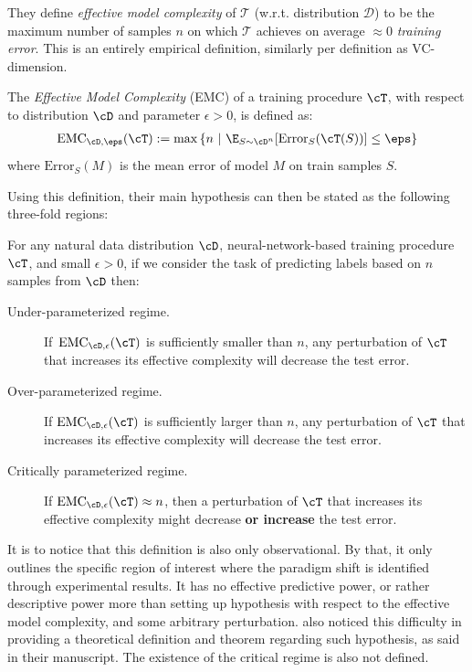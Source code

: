 \documentclass[10pt]{article} %
\begin{document}
They define \emph{effective model complexity} of $\mathcal{T}$ (w.r.t. distribution $\mathcal D$) to be the maximum number of samples $n$ on which $\mathcal{T}$ achieves on average $\approx 0$ \emph{training error}. This is an entirely empirical definition, similarly per definition as VC-dimension. 

\newcommand{\EMC}{\mathrm{EMC}}
\begin{definition}
The \emph{Effective Model Complexity} (EMC) of a training procedure $\cT$, with respect to distribution $\cD$ and parameter $\epsilon>0$,
is defined as:
\begin{align*}
    \EMC_{\cD,\eps}(\cT)
    :=  \max \left\{n ~|~ \E_{S \sim \cD^n}[ \mathrm{Error}_S( \cT( S )  ) ] \leq \eps \right\}
    \end{align*}
    where $\mathrm{Error}_S(M)$ is the mean error of model $M$ on train samples $S$.
\end{definition}

Using this definition, their main hypothesis can then be stated as the following three-fold regions:

\begin{hypothesis} \label{hyp:informaldd}
For any natural data distribution $\cD$, neural-network-based training procedure $\cT$, and small $\epsilon>0$,
if we consider the task of predicting labels based on  $n$ samples from $\cD$ then:
\begin{description}
    \item[Under-parameterized regime.]  If~$\EMC_{\cD,\epsilon}(\cT)$ is sufficiently smaller than $n$, any perturbation of $\cT$ that increases its effective complexity will decrease the test error.
    \item[Over-parameterized regime.] If $\EMC_{\cD,\epsilon}(\cT)$ is sufficiently larger than $n$,
    any perturbation of $\cT$ that increases its effective complexity will decrease the test error.
    
    \item[Critically parameterized regime.] If $\EMC_{\cD,\epsilon}(\cT) \approx n$, then
    a perturbation of $\cT$ that increases its effective complexity
    might decrease {\bf or increase} the test error.
\end{description}
\end{hypothesis}

It is to notice that this definition is also only observational. By that, it only outlines the specific region of interest where the paradigm shift is identified through experimental results. It has no effective predictive power, or rather descriptive power more than setting up hypothesis with respect to the effective model complexity, and some arbitrary perturbation. \cite{nakkiran_deep_2019} also noticed this difficulty in providing a theoretical definition and theorem regarding such hypothesis, as said in their manuscript. The existence of the critical regime is also not defined. 
\end{document}
